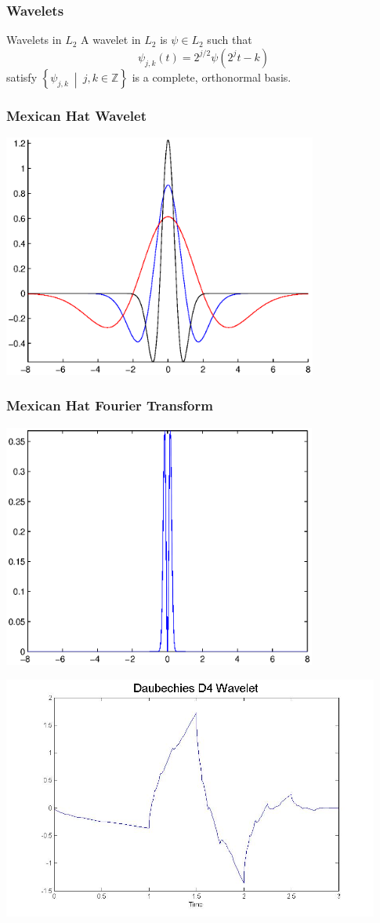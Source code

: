 \documentclass[10pt]{beamer}
\newcommand{\Z}{\mathbb{Z}}
\begin{document}
\begin{frame}
\frametitle{Wavelets}
\begin{block}{Wavelets in $L_2$}
A wavelet in $L_2$ is $\psi \in L_2$ such that
$$
\psi_{j,k}(t)=2^{j/2}\psi(2^jt-k)
$$
satisfy $\left \{\psi_{j,k} \ \middle | \ j,k \in \Z \right \}$ is a complete, orthonormal basis.
\end{block}
\end{frame}

\begin{frame}
\frametitle{Mexican Hat Wavelet}
\includegraphics[height=8cm]{mexhats.eps}
\end{frame}

\begin{frame}
\frametitle{Mexican Hat Fourier Transform}
\includegraphics[height=8cm]{mexhatFour.eps}
\end{frame}

\begin{frame}
\includegraphics[height=8cm]{D4}
\end{frame}
\end{document}
